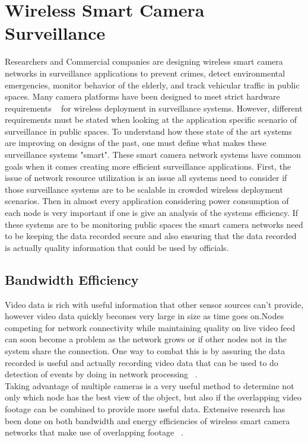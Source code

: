 \documentclass[journal,transmag]{IEEEtran}
\begin{document}

\section{Wireless Smart Camera Surveillance}
Researchers and Commercial companies are designing wireless smart camera networks in surveillance applications to prevent crimes, detect environmental emergencies,
monitor behavior of the elderly, and track vehicular traffic in public spaces. Many camera platforms have been designed to meet strict hardware requirements
~\cite{Flexi-WVSNP} for wireless deployment in surveillance systems. However, different requirements must be stated when looking at the application specific 
scenario of surveillance in public spaces. To understand how these state of the art systems are improving on designs of the past, one must define what makes these
surveillance systems "smart". These smart camera network systems have common goals when it comes creating more efficient surveillance applications. First, the issue 
of network resource utilization is an issue all systems need to consider if those surveillance systems are to be scalable in crowded wireless deployment 
scenarios. Then in almost every application considering power consumption of each node is very important if one is give an analysis of the systems 
efficiency. If these systems are to be monitoring public spaces the smart camera networks need to be keeping the data recorded secure and also
ensuring that the data recorded is actually quality information that could be used by officials. 

\subsection{Bandwidth Efficiency}
Video data is rich with useful information that other sensor sources can’t provide, however video data quickly becomes very large in size as time goes 
on.Nodes competing for network connectivity while maintaining quality on live video feed can soon become a problem as the network grows or if other 
nodes not in the system share the connection. One way to combat this is by assuring the data recorded is useful and actually recording video data that 
can be used to do detection of events by doing in network processing ~\cite{Citric}.\\
Taking advantage of multiple cameras is a very useful method to determine not only which node has the best view of the object, but also if the overlapping
video footage can be combined to provide more useful data. Extensive research has been done on both bandwidth and energy efficiencies of wireless
smart camera networks that make use of overlapping footage ~\cite{AccLatEnergy}.
\end{document}
